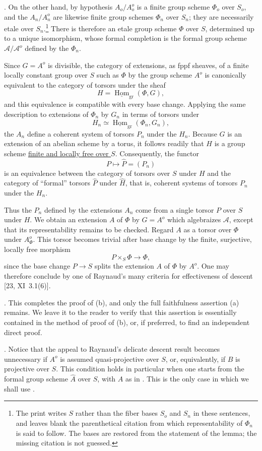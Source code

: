\medskip
\noindent
{}. On the other hand, by hypothesis $A_o/A_o^o$ is a finite
group scheme $\Phi_o$ over $S_o$, and the $A_n/A_n^o$ are likewise
finite group schemes $\Phi_n$ over $S_n$; they are necessarily etale
over $S_n$.\footnote{The print writes $S$ rather than the fiber bases
$S_o$ and $S_n$ in these sentences, and leaves blank the
parenthetical citation from which representability of $\Phi_n$ is
said to follow.  The bases are restored from the statement of the
lemma; the missing citation is not guessed.}  There is therefore an
etale group scheme $\Phi$ over $S$, determined up to a unique
isomorphism, whose formal completion is the formal group scheme
$\mathcal A/\mathcal A^o$ defined by the $\Phi_n$.

Since $G=A^o$ is divisible, the category of extensions, as fppf
sheaves, of a finite locally constant group over $S$ such as $\Phi$
by the group scheme $A^o$ is canonically equivalent to the category
of torsors under the sheaf
\[
 H=\underline{\operatorname{Hom}}_{\mathrm{gr}}(\Phi,G),
\]
and this equivalence is compatible with every base change.  Applying
the same description to extensions of $\Phi_n$ by $G_n$ in terms of
torsors under
\[
 H_n\simeq
 \underline{\operatorname{Hom}}_{\mathrm{gr}}(\Phi_n,G_n),
\]
the $A_n$ define a coherent system of torsors $P_n$ under the $H_n$.
Because $G$ is an extension of an abelian scheme by a torus, it follows
readily that $H$ is a group scheme \underline{finite and locally free
over $S$}.  Consequently, the functor
\[
 P\longmapsto\widehat P=(P_n)
\]
is an equivalence between the category of torsors over $S$ under $H$
and the category of ``formal'' torsors $\widehat P$ under
$\widehat H$, that is, coherent systems of torsors $P_n$ under the
$H_n$.

Thus the $P_n$ defined by the extensions $A_n$ come from a single
torsor $P$ over $S$ under $H$.  We obtain an extension $A$ of $\Phi$
by $G=A^o$ which algebraizes $\mathcal A$, except that its
representability remains to be checked.  Regard $A$ as a torsor over
$\Phi$ under $A^o_\Phi$.  This torsor becomes trivial after base
change by the finite, surjective, locally free morphism
\[
 P\times_S\Phi\longrightarrow\Phi,
\]
since the base change $P\longrightarrow S$ splits the extension $A$
of $\Phi$ by $A^o$.  One may therefore conclude by one of Raynaud's
many criteria for effectiveness of descent [23, XI~3.1(6)].

\medskip
\noindent
{}. This completes the proof of (b), and only the full
faithfulness assertion (a) remains.  We leave it to the reader to
verify that this assertion is essentially contained in the method of
proof of (b), or, if preferred, to find an independent direct proof.

\medskip
\noindent
{}. Notice that the appeal to Raynaud's delicate descent result
becomes unnecessary if $A^o$ is assumed quasi-projective over $S$, or,
equivalently, if $B$ is projective over $S$.  This condition holds in
particular when one starts from the formal group scheme $\widehat A$
over $S$, with $A$ as in .  This is the only case in which we
shall use .
